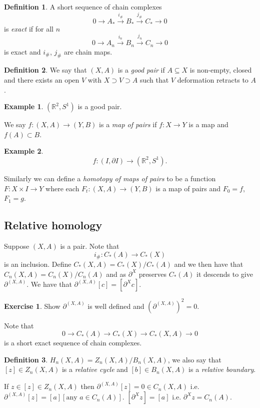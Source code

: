 \documentclass[12pt]{article}
\theoremstyle{definition}
\theoremstyle{definition}
\newtheorem*{defn}{Definition}
\newtheorem*{ex}{Example}
\newtheorem*{exer}{Exercise}
\newcommand{\RR}{\mathbb{R}}
\newcommand{\C}{C_*}
\begin{document}
\begin{defn}
A short sequence of chain complexes
\[
0 \to A_* \xrightarrow{i_\#} B_* \xrightarrow{j_\#} C_* \to 0
\]
is \emph{exact} if for all $n$
\[
0 \to A_n \xrightarrow{i_n} B_n \xrightarrow{j_n} C_n \to 0
\]
is exact and $i_\#$, $j_\#$ are chain maps.
\end{defn}

\begin{defn}
We say that $(X,A)$ is a \emph{good pair} if $A\subseteq X$ is non-empty, closed and there exists an open $V$ with $X\supset V \supset A$ such that $V$ deformation retracts to $A$.
\end{defn}

\begin{ex}
$(\RR^2,S^1)$ is a good pair.
\end{ex}

We say $f\colon (X,A) \to (Y,B)$ is a \emph{map of pairs} if $f\colon X \to Y$ is a map and $f(A)  \subset B$.
\begin{ex}
\[
f\colon (I, \partial I) \to (\RR^2, S^1).
\]
\end{ex}
Similarly we can define a \emph{homotopy of maps of pairs} to be a function $F\colon X\times I \to Y$ where each $F_t\colon (X,A)\to (Y,B)$ is a map of pairs and $F_0= f$, $F_1 = g$.

\subsection{Relative homology}
Suppose $(X,A)$ is a pair.
Note that 
\[
i_\# \colon \C(A) \to \C(X)
\]
is an inclusion.
Define $\C(X,A) = \C(X)/\C(A)$ and we then have that $C_n(X,A) = C_n(X)/C_n(A)$ and as $\partial^X$ preserves $\C(A)$ it descends to give $\partial^{(X,A)}$.
We have that $\partial^{(X,A)}[c] = [\partial^X c]$.

\begin{exer}
Show $\partial^{(X,A)}$ is well defined and $(\partial^{(X,A)})^2 = 0$.
\end{exer}

Note that 
\[
0 \to \C(A) \to \C(X) \to \C(X,A) \to 0
\]
is a short exact sequence of chain complexes.

\begin{defn}
$H_n(X,A) = Z_n(X,A) / B_n(X,A)$, we also say that $[z] \in Z_n(X,A)$ is a \emph{relative cycle} and $[b]\in B_n(X,A)$ is a \emph{relative boundary}.
\end{defn}

If $z \in [z] \in Z_n(X,A)$ then $\partial^{(X,A)}[z] = 0 \in C_n(X,A)$ i.e. $\partial^{(X,A)}[z] = [a][\text{any }a\in C_n(A)]$.
$[\partial^X z] = [a]$ i.e. $\partial^X z = C_n(A)$.
\end{document}
